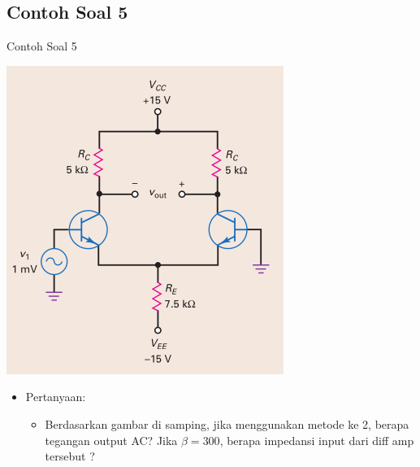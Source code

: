 \documentclass[aspectratio=169]{beamer}
\begin{document}
\subsection{Contoh Soal 5}
\begin{frame}{Contoh Soal 5}
	\begin{multicols}{2}
		\begin{center}
			\includegraphics[height=0.7\textheight]{gambar/01.contoh_soal_1-2}
		\end{center}
		\columnbreak
		\begin{itemize}
			\item Pertanyaan:
			\begin{itemize}
				\item Berdasarkan gambar di samping, jika menggunakan metode ke 2, berapa tegangan output AC? Jika $ \beta = 300 $, berapa impedansi input dari diff amp tersebut ?
			\end{itemize}
		\end{itemize}
	\end{multicols}
\end{frame}
\end{document}
